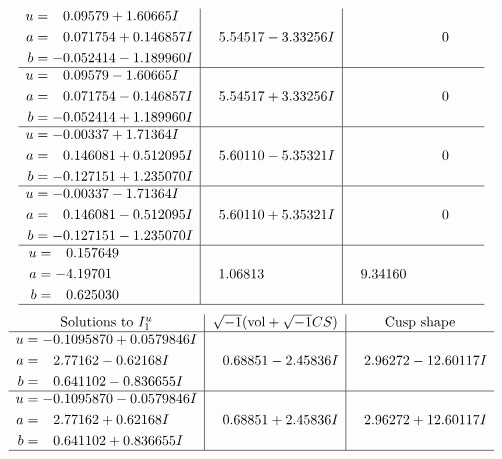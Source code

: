 \documentclass[1p]{elsarticle_modified}
\theoremstyle{definition}
\newcommand{\I}{\sqrt{-1}}
\begin{document}
$$\begin{array}{c|c|c}
\begin{aligned}
u &= \phantom{-}0.09579 + 1.60665 I \\
a &= \phantom{-}0.071754 + 0.146857 I \\
b &= -0.052414 - 1.189960 I\end{aligned}
 & \phantom{-}5.54517 - 3.33256 I & \phantom{-0.000000 } 0 \\ \hline\begin{aligned}
u &= \phantom{-}0.09579 - 1.60665 I \\
a &= \phantom{-}0.071754 - 0.146857 I \\
b &= -0.052414 + 1.189960 I\end{aligned}
 & \phantom{-}5.54517 + 3.33256 I & \phantom{-0.000000 } 0 \\ \hline\begin{aligned}
u &= -0.00337 + 1.71364 I \\
a &= \phantom{-}0.146081 + 0.512095 I \\
b &= -0.127151 + 1.235070 I\end{aligned}
 & \phantom{-}5.60110 - 5.35321 I & \phantom{-0.000000 } 0 \\ \hline\begin{aligned}
u &= -0.00337 - 1.71364 I \\
a &= \phantom{-}0.146081 - 0.512095 I \\
b &= -0.127151 - 1.235070 I\end{aligned}
 & \phantom{-}5.60110 + 5.35321 I & \phantom{-0.000000 } 0 \\ \hline\begin{aligned}
u &= \phantom{-}0.157649\phantom{ +0.000000I} \\
a &= -4.19701\phantom{ +0.000000I} \\
b &= \phantom{-}0.625030\phantom{ +0.000000I}\end{aligned}
 & \phantom{-}1.06813\phantom{ +0.000000I} & \phantom{-}9.34160\phantom{ +0.000000I}\\
 \hline 
 \end{array}$$\newpage$$\begin{array}{c|c|c}  
\text{Solutions to }I^u_{1}& \I (\text{vol} + \sqrt{-1}CS) & \text{Cusp shape}\\
 \hline 
\begin{aligned}
u &= -0.1095870 + 0.0579846 I \\
a &= \phantom{-}2.77162 - 0.62168 I \\
b &= \phantom{-}0.641102 - 0.836655 I\end{aligned}
 & \phantom{-}0.68851 - 2.45836 I & \phantom{-}2.96272 - 12.60117 I \\ \hline\begin{aligned}
u &= -0.1095870 - 0.0579846 I \\
a &= \phantom{-}2.77162 + 0.62168 I \\
b &= \phantom{-}0.641102 + 0.836655 I\end{aligned}
 & \phantom{-}0.68851 + 2.45836 I & \phantom{-}2.96272 + 12.60117 I\\
 \hline 
 \end{array}$$\newpage\newpage\renewcommand{\arraystretch}{1}
\end{document}
